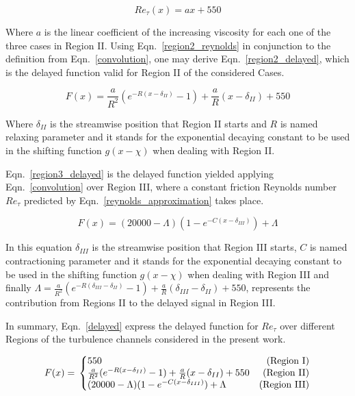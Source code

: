 \documentclass[twocolumn,10pt]{asme2e}
\begin{document}
\begin{equation}
Re_{\tau}(x)=ax+550
\label{region2_reynolds}
\end{equation}

Where \(a\) is the linear coefficient of the increasing viscosity for each one of the three cases in Region II. Using Eqn.~\ref{region2_reynolds} in conjunction to the definition from Eqn.~\ref{convolution}, one may derive Eqn.~\ref{region2_delayed}, which is the delayed function valid for Region II of the considered Cases.

\begin{equation}
F(x)= \frac{a}{R^2}(e^{-R(x-{\delta}_{II})}-1)+\frac{a}{R}(x-{\delta}_{II})+550
\label{region2_delayed}
\end{equation}

Where \({\delta}_{II}\) is the streamwise position that Region II starts and \(R\) is named relaxing parameter and it stands for the exponential decaying constant to be used in the shifting function \(g(x-\chi)\) when dealing with Region II.

Eqn.~\ref{region3_delayed} is the delayed function yielded applying Eqn.~\ref{convolution} over Region III, where a constant friction Reynolds number \(Re_{\tau}\) predicted by Eqn.~\ref{reynolds_approximation} takes place.

\begin{equation}
F(x)= (20000-{\Lambda})(1-e^{-C(x-{\delta}_{III})})+{\Lambda}
\label{region3_delayed}
\end{equation}

In this equation \({\delta}_{III}\) is the streamwise position that Region III starts, \(C\) is named contractioning parameter and it stands for the exponential decaying constant to be used in the shifting function \(g(x-\chi)\) when dealing with Region III and finally
 \({\Lambda}=\frac{a}{R^2}(e^{-R({\delta}_{III}-{\delta}_{II})}-1)+\frac{a}{R}({\delta}_{III}-{\delta}_{II})+550\), represents the contribution from Regions II to the delayed signal in Region III.

In summary, Eqn.~\ref{delayed} express the delayed function for \(Re_{\tau}\) over different Regions of the turbulence channels considered in the present work.

\begin{equation} \label{delayed}
F(x) = \\
    \left\{\begin{array}{@{}lr@{}}
        550  & \text{(Region I)}\\
        \frac{a}{R^2}(e^{-R(x-{\delta}_{II})}-1)+\frac{a}{R}(x-{\delta}_{II})+550 & \text{(Region II)}\\
        (20000-{\Lambda})(1-e^{-C(x-{\delta}_{III})})+{\Lambda} &  \text{(Region III)}
\end{array}\right.
\end{equation}
\end{document}
